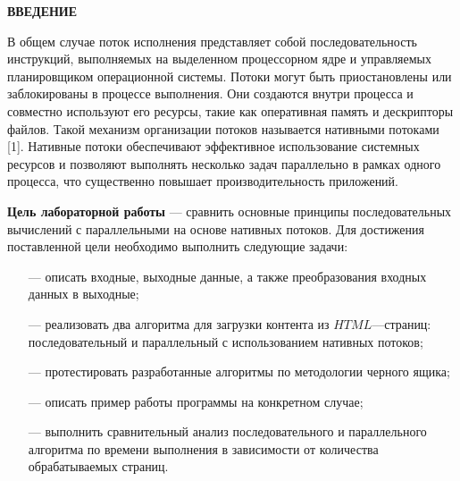 \begin{center}
    \textbf{ВВЕДЕНИЕ}
\end{center}

В общем случае поток исполнения представляет собой последовательность инструкций, выполняемых на выделенном процессорном ядре и управляемых планировщиком операционной системы. Потоки могут быть приостановлены или заблокированы в процессе выполнения. Они создаются внутри процесса и совместно используют его ресурсы, такие как оперативная память и дескрипторы файлов. Такой механизм организации потоков называется нативными потоками [1]. Нативные потоки обеспечивают эффективное использование системных ресурсов и позволяют выполнять несколько задач параллельно в рамках одного процесса, что существенно повышает производительность приложений.

\textbf{Цель лабораторной работы} --- сравнить основные принципы последовательных вычислений с параллельными на основе нативных потоков. Для достижения поставленной цели необходимо выполнить следующие задачи:

\begin{itemize}
	\item[---] описать входные, выходные данные, а также преобразования входных данных в выходные;
	\item[---] реализовать два алгоритма для загрузки контента из $HTML$---страниц: последовательный и параллельный с использованием нативных потоков;
	\item[---] протестировать разработанные алгоритмы по методологии черного ящика;
    \item[---] описать пример работы программы на конкретном случае;
    \item[---] выполнить сравнительный анализ последовательного и параллельного алгоритма по времени выполнения в зависимости от количества обрабатываемых страниц.
\end{itemize}